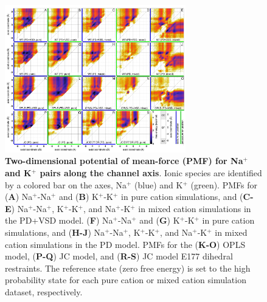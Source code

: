 \begin{refsection}
\begin{figure}[!ptb]
\centering
\includegraphics[width=0.7\textwidth]{nav2/Nav2FigS7}
\caption[Two-dimensional potential of mean-force (PMF) for Na$^+$ and K$^+$ pairs along the channel axis]{\textbf{Two-dimensional potential of mean-force (PMF) for Na$^+$ and K$^+$ pairs along the channel axis}. Ionic species are identified by a colored bar on the axes, Na$^+$ (blue) and K$^+$ (green). PMFs for (\textbf{A}) Na$^+$-Na$^+$ and (\textbf{B}) K$^+$-K$^+$ in pure cation simulations, and (\textbf{C-E}) Na$^+$-Na$^+$, K$^+$-K$^+$, and Na$^+$-K$^+$ in mixed cation simulations in the PD+VSD model. (\textbf{F}) Na$^+$-Na$^+$ and (\textbf{G}) K$^+$-K$^+$ in pure cation simulations, and (\textbf{H-J}) Na$^+$-Na$^+$, K$^+$-K$^+$, and Na$^+$-K$^+$ in mixed cation simulations in the PD model. PMFs for the (\textbf{K-O}) OPLS model, (\textbf{P-Q}) JC model, and (\textbf{R-S}) JC model E177 dihedral restraints. The reference state (zero free energy) is set to the high probability state for each pure cation or mixed cation simulation dataset, respectively.}
\label{fig:nav2figS7}
\end{figure}


\end{refsection}
